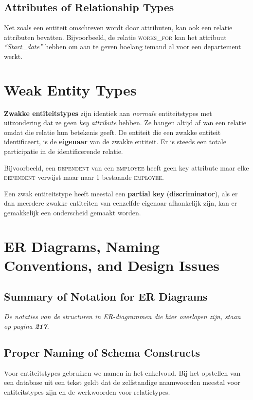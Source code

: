\subsection{Attributes of Relationship Types}
Net zoals een entiteit omschreven wordt door attributen, kan ook een relatie attributen bevatten. Bijvoorbeeld, de relatie \textsc{works\_for} kan het attribuut \textit{``Start\_date''} hebben om aan te geven hoelang iemand al voor een departement werkt.


\section{Weak Entity Types}
\textbf{Zwakke entiteitstypes} zijn identiek aan \textit{normale} entiteitstypes met uitzondering dat ze geen \textit{key attribute} hebben. Ze hangen altijd af van een relatie omdat die relatie hun betekenis geeft. De entiteit die een zwakke entiteit identificeert, is de \textbf{eigenaar} van de zwakke entiteit. Er is steeds een totale participatie in de identificerende relatie.

Bijvoorbeeld, een \textsc{dependent} van een \textsc{employee} heeft geen key attribute maar elke \textsc{dependent} verwijst maar naar 1 bestaande \textsc{employee}.

Een zwak entiteitstype heeft meestal een \textbf{partial key} (\textbf{discriminator}), als er dan meerdere zwakke entiteiten van eenzelfde eigenaar afhankelijk zijn, kan er gemakkelijk een onderscheid gemaakt worden.


\setcounter{section}{6}


\section{ER Diagrams, Naming Conventions, and Design Issues}
\subsection{Summary of Notation for ER Diagrams}
\textit{De notaties van de structuren in ER-diagrammen die hier overlopen zijn, staan op pagina \textbf{217}.}

\subsection{Proper Naming of Schema Constructs}
Voor entiteitstypes gebruiken we namen in het enkelvoud. Bij het opstellen van een database uit een tekst geldt dat de zelfstandige naamwoorden meestal voor entiteitstypes zijn en de werkwoorden voor relatietypes.

